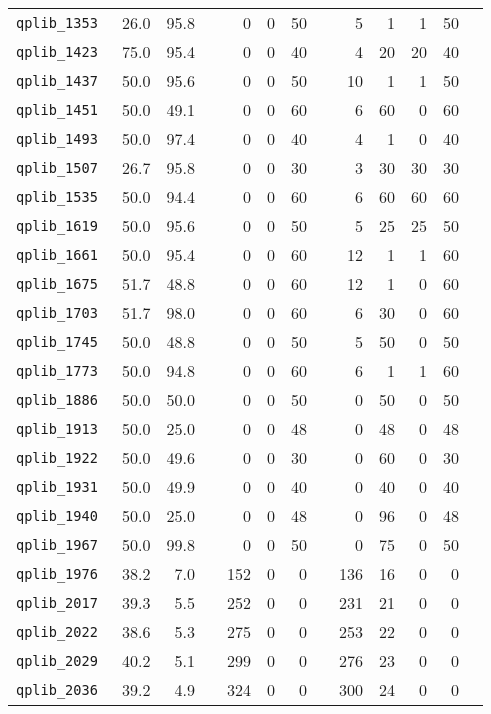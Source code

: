 {\begin{longtable}{lrrrrrrrrrrrr}
{\tt 	qplib\_1353	}	&	26.0	&	95.8	&	&	0	&	0	&	50	&	&	5	&	1	&	1	&	50	\\
{\tt 	qplib\_1423	}	&	75.0	&	95.4	&	&	0	&	0	&	40	&	&	4	&	20	&	20	&	40	\\
{\tt 	qplib\_1437	}	&	50.0	&	95.6	&	&	0	&	0	&	50	&	&	10	&	1	&	1	&	50	\\
{\tt 	qplib\_1451	}	&	50.0	&	49.1	&	&	0	&	0	&	60	&	&	6	&	60	&	0	&	60	\\
{\tt 	qplib\_1493	}	&	50.0	&	97.4	&	&	0	&	0	&	40	&	&	4	&	1	&	0	&	40	\\
{\tt 	qplib\_1507	}	&	26.7	&	95.8	&	&	0	&	0	&	30	&	&	3	&	30	&	30	&	30	\\
{\tt 	qplib\_1535	}	&	50.0	&	94.4	&	&	0	&	0	&	60	&	&	6	&	60	&	60	&	60	\\
{\tt 	qplib\_1619	}	&	50.0	&	95.6	&	&	0	&	0	&	50	&	&	5	&	25	&	25	&	50	\\
{\tt 	qplib\_1661	}	&	50.0	&	95.4	&	&	0	&	0	&	60	&	&	12	&	1	&	1	&	60	\\
{\tt 	qplib\_1675	}	&	51.7	&	48.8	&	&	0	&	0	&	60	&	&	12	&	1	&	0	&	60	\\
{\tt 	qplib\_1703	}	&	51.7	&	98.0	&	&	0	&	0	&	60	&	&	6	&	30	&	0	&	60	\\
{\tt 	qplib\_1745	}	&	50.0	&	48.8	&	&	0	&	0	&	50	&	&	5	&	50	&	0	&	50	\\
{\tt 	qplib\_1773	}	&	50.0	&	94.8	&	&	0	&	0	&	60	&	&	6	&	1	&	1	&	60	\\
{\tt 	qplib\_1886	}	&	50.0	&	50.0	&	&	0	&	0	&	50	&	&	0	&	50	&	0	&	50	\\
{\tt 	qplib\_1913	}	&	50.0	&	25.0	&	&	0	&	0	&	48	&	&	0	&	48	&	0	&	48	\\
{\tt 	qplib\_1922	}	&	50.0	&	49.6	&	&	0	&	0	&	30	&	&	0	&	60	&	0	&	30	\\
{\tt 	qplib\_1931	}	&	50.0	&	49.9	&	&	0	&	0	&	40	&	&	0	&	40	&	0	&	40	\\
{\tt 	qplib\_1940	}	&	50.0	&	25.0	&	&	0	&	0	&	48	&	&	0	&	96	&	0	&	48	\\
{\tt 	qplib\_1967	}	&	50.0	&	99.8	&	&	0	&	0	&	50	&	&	0	&	75	&	0	&	50	\\
{\tt 	qplib\_1976	}	&	38.2	&	7.0	&	&	152	&	0	&	0	&	&	136	&	16	&	0	&	0	\\
{\tt 	qplib\_2017	}	&	39.3	&	5.5	&	&	252	&	0	&	0	&	&	231	&	21	&	0	&	0	\\
{\tt 	qplib\_2022	}	&	38.6	&	5.3	&	&	275	&	0	&	0	&	&	253	&	22	&	0	&	0	\\
{\tt 	qplib\_2029	}	&	40.2	&	5.1	&	&	299	&	0	&	0	&	&	276	&	23	&	0	&	0	\\
{\tt 	qplib\_2036	}	&	39.2	&	4.9	&	&	324	&	0	&	0	&	&	300	&	24	&	0	&	0	\\

\end{longtable}}
